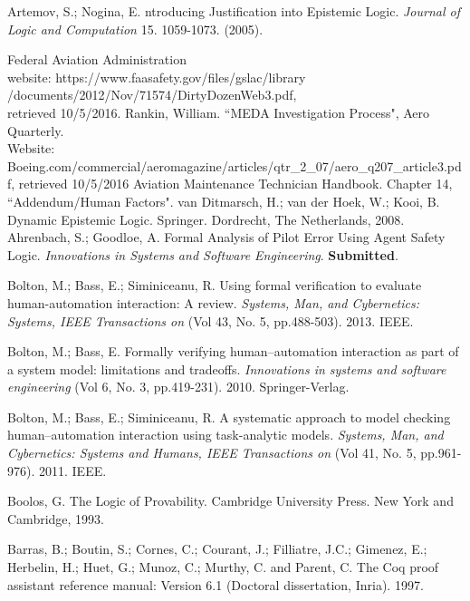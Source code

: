 \newpage
{}


%
\begin{thebibliography}{9}
		Artemov, S.; Nogina, E. ntroducing Justification into Epistemic Logic. {\em Journal of Logic and Computation } 15. 1059-1073. (2005). 
	
	 	 Federal Aviation Administration \\ website: https://www.faasafety.gov/files/gslac/library\\/documents/2012/Nov/71574/DirtyDozenWeb3.pdf,\\
	 	retrieved 10/5/2016.
	 	 Rankin, William. ``MEDA Investigation Process", Aero Quarterly.\\ Website: Boeing.com/commercial/aeromagazine/articles/qtr\_2\_07/aero\_q207\_article3.pdf,
	 	retrieved 10/5/2016
	 	 Aviation Maintenance Technician Handbook. Chapter 14, ``Addendum/Human Factors". 
	 	 van Ditmarsch, H.; van der Hoek, W.; Kooi, B. Dynamic Epistemic Logic. Springer. Dordrecht, The Netherlands, 2008. 
	 	Ahrenbach, S.; Goodloe, A. Formal Analysis of Pilot Error Using Agent Safety Logic. {\em Innovations in Systems and Software Engineering}. {\bf Submitted}.
	 	
	 	Bolton, M.; Bass, E.; Siminiceanu, R. Using formal verification to evaluate human-automation interaction: A review. \emph{Systems, Man, and Cybernetics: Systems, IEEE Transactions on} (Vol 43, No. 5, pp.488-503). 2013. IEEE.
	 	
	 	Bolton, M.; Bass, E. Formally verifying human--automation interaction as part of a system model: limitations and tradeoffs. \emph{Innovations in systems and software engineering} (Vol 6, No. 3, pp.419-231). 2010. Springer-Verlag.
	 	
	 	Bolton, M.; Bass, E.; Siminiceanu, R. A systematic approach to model checking human--automation interaction using task-analytic models. \emph{Systems, Man, and Cybernetics: Systems and Humans, IEEE Transactions on} (Vol 41, No. 5, pp.961-976). 2011. IEEE.
	 	
	 	Boolos, G. The Logic of Provability. Cambridge University Press. New York and Cambridge, 1993.
	 	
	 	Barras, B.; Boutin, S.; Cornes, C.; Courant, J.; Filliatre, J.C.; Gimenez, E.; Herbelin, H.; Huet, G.; Munoz, C.; Murthy, C. and Parent, C. The Coq proof assistant reference manual: Version 6.1 (Doctoral dissertation, Inria). 1997.
	 	

\end{thebibliography}
